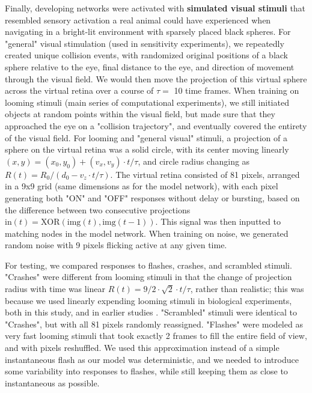 \documentclass{article}
\begin{document}
Finally, developing networks were activated with \textbf{simulated visual stimuli} that resembled sensory activation a real animal could have experienced when navigating in a bright-lit environment with sparsely placed black spheres. For "general" visual stimulation (used in sensitivity experiments), we repeatedly created unique collision events, with randomized original positions of a black sphere relative to the eye, final distance to the eye, and direction of movement through the visual field. We would then move the projection of this virtual sphere across the virtual retina over a course of $\tau=$ 10 time frames.  When training on looming stimuli (main series of computational experiments), we still initiated objects at random points within the visual field, but made sure that they approached the eye on a "collision trajectory", and eventually covered the entirety of the visual field. For looming and "general visual" stimuli, a projection of a sphere on the virtual retina was a solid circle, with its center moving linearly $(x,y) = (x_0,y_0)+(v_x,v_y)\cdot t/\tau$, and circle radius changing as $R(t) = R_0/(d_0 - v_z \cdot t/\tau)$. The virtual retina consisted of 81 pixels, arranged in a 9x9 grid (same dimensions as for the model network), with each pixel generating both "ON" and "OFF" responses without delay or bursting, based on the difference between two consecutive projections $\text{in}(t) = \text{XOR}(\text{img}(t),\text{img}(t-1))$. This signal was then inputted to matching nodes in the model network. When training on noise, we generated random noise with 9 pixels flicking active at any given time. 

For testing, we compared responses to flashes, crashes, and scrambled stimuli. "Crashes" were different from looming stimuli in that the change of projection radius with time was linear $R(t) = 9/2 \cdot \sqrt{2} \cdot t/\tau$, rather than realistic; this was because we used linearly expending looming stimuli in biological experiments, both in this study, and in earlier studies \citep{khakhalin2014}. "Scrambled" stimuli were identical to "Crashes", but with all 81 pixels randomly reassigned. "Flashes" were modeled as very fast looming stimuli that took exactly 2 frames to fill the entire field of view, and with pixels reshuffled. We used this approximation instead of a simple instantaneous flash as our model was deterministic, and we needed to introduce some variability into responses to flashes, while still keeping them as close to instantaneous as possible. 
\end{document}
